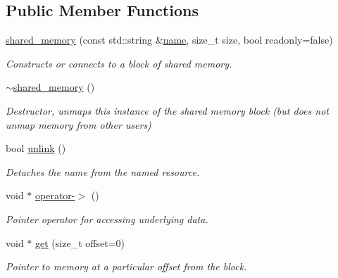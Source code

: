 \subsection*{Public Member Functions}
\begin{DoxyCompactItemize}
\item 
\hyperlink{classcpen333_1_1process_1_1posix_1_1shared__memory_a8a8f0918f8e132e0369c6e9ca9aa6bb6}{shared\+\_\+memory} (const std\+::string \&\hyperlink{classcpen333_1_1process_1_1impl_1_1named__resource__base_ae0c5fbb1843afe863cece4b51c38f807}{name}, size\+\_\+t size, bool readonly=false)
\begin{DoxyCompactList}\small\item\em Constructs or connects to a block of shared memory. \end{DoxyCompactList}\item 
\mbox{\label{classcpen333_1_1process_1_1posix_1_1shared__memory_a618389d509320111d7aef051fbd32c07}} 
\hyperlink{classcpen333_1_1process_1_1posix_1_1shared__memory_a618389d509320111d7aef051fbd32c07}{$\sim$shared\+\_\+memory} ()
\begin{DoxyCompactList}\small\item\em Destructor, unmaps this instance of the shared memory block (but does not unmap memory from other users) \end{DoxyCompactList}\item 
bool \hyperlink{classcpen333_1_1process_1_1posix_1_1shared__memory_a3b6d67a41cfaca3712d87958682d8bbe}{unlink} ()
\begin{DoxyCompactList}\small\item\em Detaches the name from the named resource. \end{DoxyCompactList}\item 
void $\ast$ \hyperlink{classcpen333_1_1process_1_1posix_1_1shared__memory_a0611e0aaf945ef86c803bb7907a99f98}{operator-\/$>$} ()
\begin{DoxyCompactList}\small\item\em Pointer operator for accessing underlying data. \end{DoxyCompactList}\item 
void $\ast$ \hyperlink{classcpen333_1_1process_1_1posix_1_1shared__memory_ae97ceec75dc83d43a995daac4769504d}{get} (size\+\_\+t offset=0)
\begin{DoxyCompactList}\small\item\em Pointer to memory at a particular offset from the block. \end{DoxyCompactList}\item 

\end{DoxyCompactItemize}
